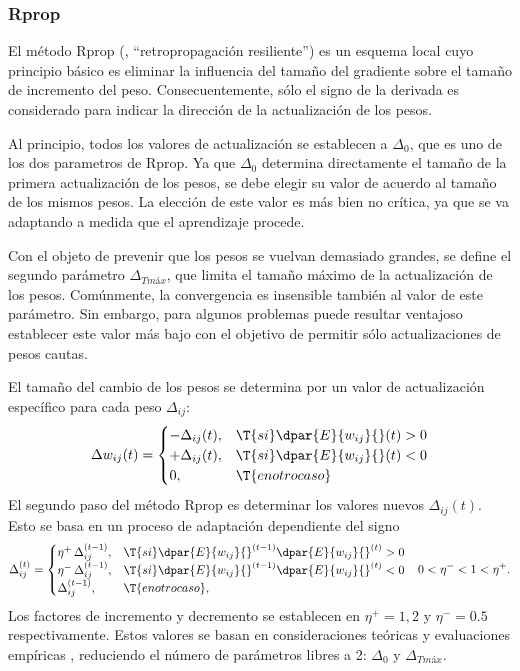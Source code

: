 %
\subsubsection{Rprop}
%
El método Rprop (, ``retropropagación
resiliente'') \cite{rprop} es un esquema local cuyo principio básico
es eliminar la influencia del tamaño del gradiente sobre el
tamaño de incremento del peso. Consecuentemente, sólo el signo de la
derivada es considerado para indicar la dirección de la actualización
de los pesos.

Al principio, todos los valores de actualización se establecen a
$\Delta_0$, que es uno de los dos parametros de Rprop. Ya que
$\Delta_0$ determina directamente el tamaño de la primera
actualización de los pesos, se debe elegir su valor de acuerdo al
tamaño de los mismos pesos. La elección de este valor es más bien no
crítica, ya que se va adaptando a medida que el aprendizaje procede.

Con el objeto de prevenir que los pesos se vuelvan demasiado grandes,
se define el segundo parámetro $\Delta_{T{máx}}$, que limita el tamaño
máximo de la actualización de los pesos. Comúnmente, la convergencia
es insensible también al valor de este parámetro. Sin embargo, para
algunos problemas puede resultar ventajoso establecer este valor más bajo
con el objetivo de permitir sólo actualizaciones de pesos cautas.

El tamaño del cambio de los pesos se determina por un
valor de actualización específico para cada peso $\Delta_{ij}$:
%
\begin{align}
  \Delta{}w_{ij}(t) = 
  \begin{cases}
    -\Delta_{ij}(t), & \T{si } \dpar{E}{w_{ij}}{}(t) > 0 \\
    +\Delta_{ij}(t), & \T{si } \dpar{E}{w_{ij}}{}(t) < 0 \\
    0, & \T{en otro caso}
  \end{cases}
\end{align}
%
El segundo paso del método Rprop es determinar los valores nuevos
$\Delta_{ij}(t)$. Esto se basa en un proceso de adaptación dependiente
del signo
%
\begin{align}
  \Delta{}_{ij}^{(t)} = 
  \begin{cases}
    \eta^+\,\Delta_{ij}^{(t-1)}, & \T{si }\dpar{E}{w_{ij}}{}^{(t-1)}
      \dpar{E}{w_{ij}}{}^{(t)} > 0 \\
    \eta^-\,\Delta_{ij}^{(t-1)}, & \T{si }\dpar{E}{w_{ij}}{}^{(t-1)}
      \dpar{E}{w_{ij}}{}^{(t)} < 0 \\
    \Delta_{ij}^{(t-1)}, & \T{en otro caso},
  \end{cases}
  && 0<\eta^-<1<\eta^+.
\end{align}
%
Los factores de incremento y decremento se establecen en $\eta^+=1,2$
y $\eta^-=0.5$ respectivamente. Estos valores se basan en
consideraciones teóricas y evaluaciones empíricas \cite{riedmiller},
reduciendo el número de parámetros libres a 2: $\Delta_0$ y
$\Delta_{T{máx}}$.

